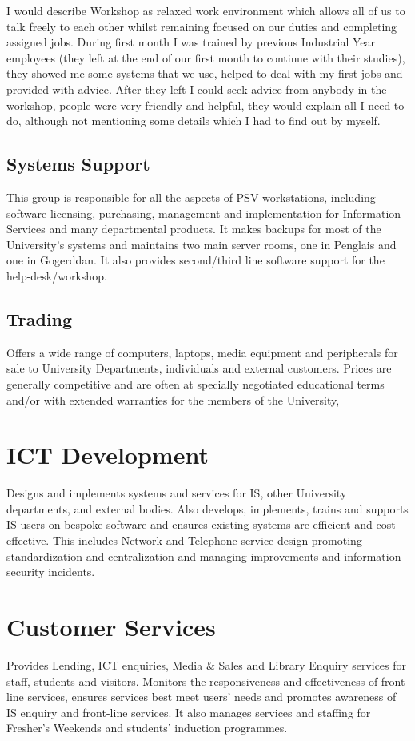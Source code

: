 \documentclass[10pt,a4paper,headinclude=true]{report}
\begin{document}
I would describe Workshop as relaxed work environment which allows all of us to talk freely to each other whilst remaining focused on our duties and completing assigned jobs. During first month I was trained by previous Industrial Year employees (they left at the end of our first month to continue with their studies), they showed me some systems that we use, helped to deal with my first jobs and provided with advice. After they left I could seek advice from anybody in the workshop, people were very friendly and helpful, they would explain all I need to do, although not mentioning some details which I had to find out by myself.
\subsection{Systems Support}
This group is responsible for all the aspects of PSV workstations, including software licensing, purchasing, management and implementation for Information Services and many departmental products. It makes backups for most of the University's systems and maintains two main server rooms, one in Penglais and one in Gogerddan. It also provides second/third line software support for the help-desk/workshop.
\subsection{Trading}
Offers a wide range of computers, laptops, media equipment and peripherals for sale to University Departments, individuals and external customers. Prices are generally competitive and are often at specially negotiated educational terms and/or with extended warranties for the members of the University,
\section{ICT Development}
Designs and implements systems and services for IS, other University departments, and external bodies. Also develops, implements, trains and supports IS users on bespoke software and ensures existing systems are efficient and cost effective. This includes Network and Telephone service design promoting standardization and centralization and managing improvements and information security incidents.
\section{Customer Services}
Provides Lending, ICT enquiries, Media \& Sales and Library Enquiry services for staff, students and visitors. Monitors the responsiveness and effectiveness of front-line services, ensures services best meet users' needs and promotes awareness of IS enquiry and front-line services. It also manages services and staffing for Fresher's Weekends and students' induction programmes.
\end{document}
